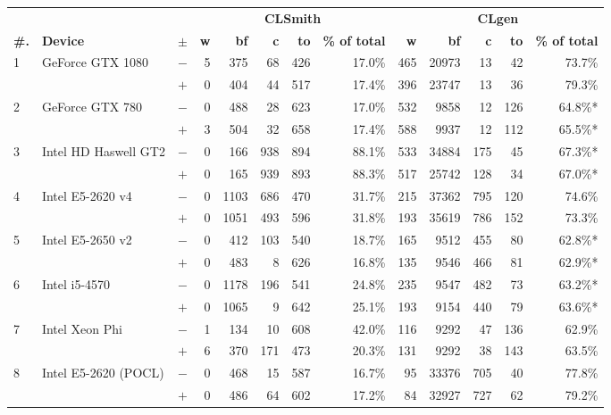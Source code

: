   \begin{tabular}{lll | rrrrr | rrrrr }
  \toprule
  & & & \multicolumn{5}{c|}{\textbf{CLSmith}} & \multicolumn{5}{c}{\textbf{CLgen}} \\
  \textbf{\#.} & \textbf{Device} & $\pm$ &
  \textbf{w} & \textbf{bf} & \textbf{c} & \textbf{to} & \textbf{\% of total} &
  \textbf{w} & \textbf{bf} & \textbf{c} & \textbf{to} & \textbf{\% of total} \\
  \midrule
  \multirow{ 2}{*}{1} & \multirow{ 2}{*}{GeForce GTX 1080} & $-$ & 5 & 375 & 68 & 426 & 17.0\%       & 465 & 20973 & 13 & 42 & 73.7\% \\& & $+$ & 0 & 404 & 44 & 517 & 17.4\% & 396 & 23747 & 13 & 36 & 79.3\% \\
\hline
\multirow{ 2}{*}{2} & \multirow{ 2}{*}{GeForce GTX 780} & $-$ & 0 & 488 & 28 & 623 & 17.0\%       & 532 & 9858 & 12 & 126 & 64.8\%* \\& & $+$ & 3 & 504 & 32 & 658 & 17.4\% & 588 & 9937 & 12 & 112 & 65.5\%* \\
\hline
\multirow{ 2}{*}{3} & \multirow{ 2}{*}{Intel HD Haswell GT2} & $-$ & 0 & 166 & 938 & 894 & 88.1\%       & 533 & 34884 & 175 & 45 & 67.3\%* \\& & $+$ & 0 & 165 & 939 & 893 & 88.3\% & 517 & 25742 & 128 & 34 & 67.0\%* \\
\hline
\multirow{ 2}{*}{4} & \multirow{ 2}{*}{Intel E5-2620 v4} & $-$ & 0 & 1103 & 686 & 470 & 31.7\%       & 215 & 37362 & 795 & 120 & 74.6\% \\& & $+$ & 0 & 1051 & 493 & 596 & 31.8\% & 193 & 35619 & 786 & 152 & 73.3\% \\
\hline
\multirow{ 2}{*}{5} & \multirow{ 2}{*}{Intel E5-2650 v2} & $-$ & 0 & 412 & 103 & 540 & 18.7\%       & 165 & 9512 & 455 & 80 & 62.8\%* \\& & $+$ & 0 & 483 & 8 & 626 & 16.8\% & 135 & 9546 & 466 & 81 & 62.9\%* \\
\hline
\multirow{ 2}{*}{6} & \multirow{ 2}{*}{Intel i5-4570} & $-$ & 0 & 1178 & 196 & 541 & 24.8\%       & 235 & 9547 & 482 & 73 & 63.2\%* \\& & $+$ & 0 & 1065 & 9 & 642 & 25.1\% & 193 & 9154 & 440 & 79 & 63.6\%* \\
\hline
\multirow{ 2}{*}{7} & \multirow{ 2}{*}{Intel Xeon Phi} & $-$ & 1 & 134 & 10 & 608 & 42.0\%       & 116 & 9292 & 47 & 136 & 62.9\% \\& & $+$ & 6 & 370 & 171 & 473 & 20.3\% & 131 & 9292 & 38 & 143 & 63.5\% \\
\hline
\multirow{ 2}{*}{8} & \multirow{ 2}{*}{Intel E5-2620 (POCL)} & $-$ & 0 & 468 & 15 & 587 & 16.7\%       & 95 & 33376 & 705 & 40 & 77.8\% \\& & $+$ & 0 & 486 & 64 & 602 & 17.2\% & 84 & 32927 & 727 & 62 & 79.2\% \\

\end{tabular}
